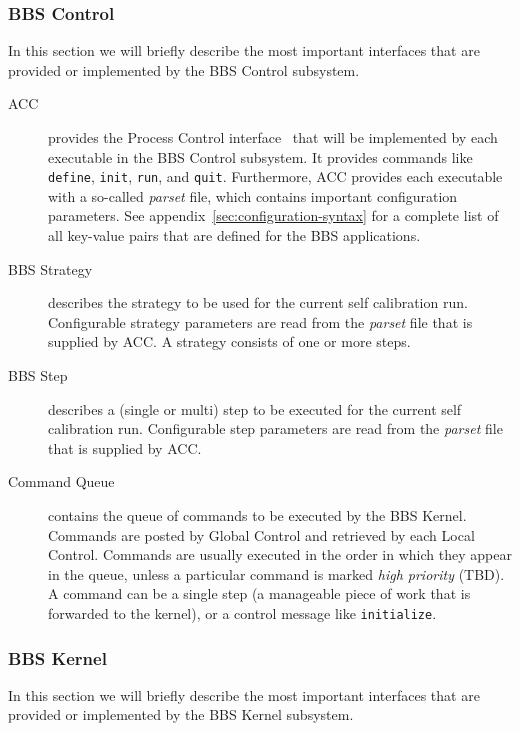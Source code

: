 \documentclass[10pt]{lofar}
\begin{document}
\subsubsection{BBS Control}
\label{subsubsec:interf-control}
In this section we will briefly describe the most important interfaces that
are provided or implemented by the BBS Control subsystem.
\begin{description}
\item [ACC] provides the Process Control interface~\cite{LOFAR-ASTRON-SDD-037}
that will be implemented by each executable in the BBS Control subsystem. It
provides commands like \texttt{define}, \texttt{init}, \texttt{run}, and
\texttt{quit}. Furthermore, ACC provides each executable with a so-called
\emph{parset} file, which contains important configuration parameters. See
appendix~\ref{sec:configuration-syntax} for a complete list of all key-value
pairs that are defined for the BBS applications.
\item [BBS Strategy] describes the strategy to be used for the current self
calibration run. Configurable strategy parameters are read from the
\emph{parset} file that is supplied by ACC. A strategy consists of one or more
steps.
\item [BBS Step] describes a (single or multi) step to be executed for the
current self calibration run. Configurable step parameters are read from the
\emph{parset} file that is supplied by ACC.
\item [Command Queue] contains the queue of commands to be executed by the BBS
Kernel. Commands are posted by Global Control and retrieved by each Local
Control. Commands are usually executed in the order in which they appear in
the queue, unless a particular command is marked \emph{high priority} (TBD). A
command can be a single step (a manageable piece of work that is forwarded to
the kernel), or a control message like \texttt{initialize}.
\end{description}


\subsubsection{BBS Kernel}
\label{subsubsec:interf-kernel}

In this section we will briefly describe the most important interfaces that
are provided or implemented by the BBS Kernel subsystem.
\end{document}
